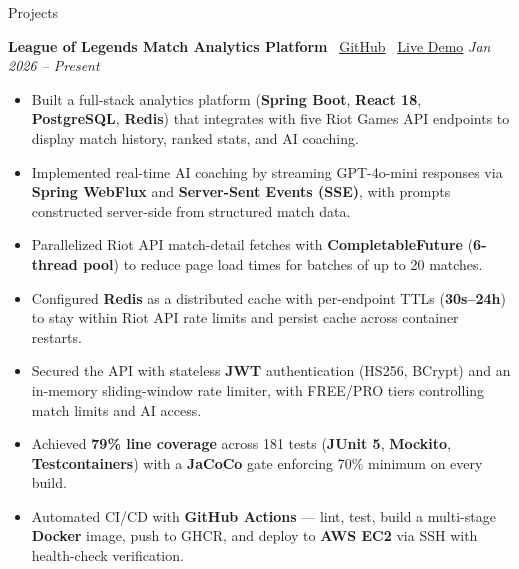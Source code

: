\documentclass{resume}
\begin{document}
\begin{rSection}{Projects}
\vspace{-0.3em}

\textbf{League of Legends Match Analytics Platform}
\textbar\ \href{https://github.com/jianweicheng0822/lol-tracker}{GitHub}
\textbar\ \href{http://3.84.122.22}{Live Demo}
\hfill {\em Jan 2026 -- Present}

\begin{itemize}
\itemsep -3.5pt
\parsep 0pt

\item Built a full-stack analytics platform (\textbf{Spring Boot}, \textbf{React 18}, \textbf{PostgreSQL}, \textbf{Redis}) that integrates with five Riot Games API endpoints to display match history, ranked stats, and AI coaching.

\item Implemented real-time AI coaching by streaming GPT-4o-mini responses via \textbf{Spring WebFlux} and \textbf{Server-Sent Events (SSE)}, with prompts constructed server-side from structured match data.

\item Parallelized Riot API match-detail fetches with \textbf{CompletableFuture} (\textbf{6-thread pool}) to reduce page load times for batches of up to 20 matches.

\item Configured \textbf{Redis} as a distributed cache with per-endpoint TTLs (\textbf{30s--24h}) to stay within Riot API rate limits and persist cache across container restarts.

\item Secured the API with stateless \textbf{JWT} authentication (HS256, BCrypt) and an in-memory sliding-window rate limiter, with FREE/PRO tiers controlling match limits and AI access.

\item Achieved \textbf{79\% line coverage} across 181 tests (\textbf{JUnit 5}, \textbf{Mockito}, \textbf{Testcontainers}) with a \textbf{JaCoCo} gate enforcing 70\% minimum on every build.

\item Automated CI/CD with \textbf{GitHub Actions} --- lint, test, build a multi-stage \textbf{Docker} image, push to GHCR, and deploy to \textbf{AWS EC2} via SSH with health-check verification.

\end{itemize}


\end{rSection}
\end{document}
